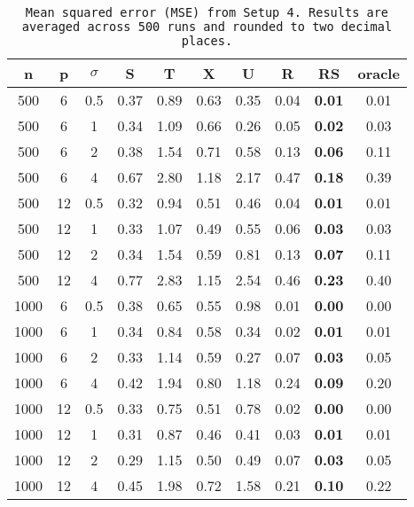 \begin{table}[ht]
\centering
\begin{tabular}{cccccccccc}
  \hline
n & p & $\sigma$ & S & T & X & U & R & RS & oracle \\ 
  \hline
500 & 6 & 0.5 & 0.37 & 0.89 & 0.63 &  0.35 & 0.04 & \bf 0.01 & 0.01 \\ 
  500 & 6 & 1 & 0.34 & 1.09 & 0.66 &  0.26 & 0.05 & \bf 0.02 & 0.03 \\ 
  500 & 6 & 2 & 0.38 & 1.54 & 0.71 &  0.58 & 0.13 & \bf 0.06 & 0.11 \\ 
  500 & 6 & 4 & 0.67 & 2.80 & 1.18 &  2.17 & 0.47 & \bf 0.18 & 0.39 \\ 
  500 & 12 & 0.5 & 0.32 & 0.94 & 0.51 &  0.46 & 0.04 & \bf 0.01 & 0.01 \\ 
  500 & 12 & 1 & 0.33 & 1.07 & 0.49 &  0.55 & 0.06 & \bf 0.03 & 0.03 \\ 
  500 & 12 & 2 & 0.34 & 1.54 & 0.59 &  0.81 & 0.13 & \bf 0.07 & 0.11 \\ 
  500 & 12 & 4 & 0.77 & 2.83 & 1.15 &  2.54 & 0.46 & \bf 0.23 & 0.40 \\ 
  1000 & 6 & 0.5 & 0.38 & 0.65 & 0.55 &  0.98 & 0.01 & \bf 0.00 & 0.00 \\ 
  1000 & 6 & 1 & 0.34 & 0.84 & 0.58 &  0.34 & 0.02 & \bf 0.01 & 0.01 \\ 
  1000 & 6 & 2 & 0.33 & 1.14 & 0.59 &  0.27 & 0.07 & \bf 0.03 & 0.05 \\ 
  1000 & 6 & 4 & 0.42 & 1.94 & 0.80 &  1.18 & 0.24 & \bf 0.09 & 0.20 \\ 
  1000 & 12 & 0.5 & 0.33 & 0.75 & 0.51 &  0.78 & 0.02 & \bf 0.00 & 0.00 \\ 
  1000 & 12 & 1 & 0.31 & 0.87 & 0.46 &  0.41 & 0.03 & \bf 0.01 & 0.01 \\ 
  1000 & 12 & 2 & 0.29 & 1.15 & 0.50 &  0.49 & 0.07 & \bf 0.03 & 0.05 \\ 
  1000 & 12 & 4 & 0.45 & 1.98 & 0.72 &  1.58 & 0.21 & \bf 0.10 & 0.22 \\ 
   \hline
\end{tabular}
\caption{\tt Mean squared error (MSE) from Setup 4. Results are averaged across 500 runs and rounded to two decimal places.} 
\label{table:setup4}
\end{table}

